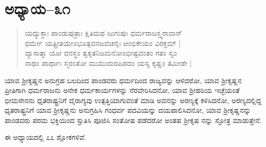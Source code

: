\section{ಅಧ್ಯಾಯ–೩೧}

\begin{verse}
ಯದ್ಯುಕ್ತಾಃ ಪಾಂಡುಪುತ್ರಾಃ ಕ್ಷಿತಿಮಥ ಜುಗುಪುಃ ಧರ್ಮರಾಜಸ್ತ್ವರಾವಾನ್ \\ ಧರ್ಮೇ ಯತ್ಪ್ರೀತಯೇಽಭೂತ್ಪವನಜವಚನೈಃ ಆಂಭಿಕೇಯಂ ವಿರಕ್ತಮ್ |\\ ವ್ಯಾಸಾತ್ಮಾ ಯೋ ವನಸ್ಥಂ ತ್ವಕೃತನಿಜಮನೋಽಭೀಷ್ಟವಂತಂ ಗತಂ ಸ್ವಂ\\ ನಾಥಂ ಪಾರ್ಥಾಃ ಸ್ಮರಂತೋ ಮುಮುದುರಪಿಪದಂ ಯಸ್ಯ ಕೃಷ್ಣಂ ತಮೀಡೇ |
\end{verse}

ಯಾವ ಶ‍್ರೀಕೃಷ್ಣನ ಅನುಗ್ರಹ ಬಲದಿಂದ ಪಾಂಡವರು ಧರ್ಮದಿಂದ ರಾಜ್ಯವನ್ನು ಆಳಿದರೋ, ಯಾವ ಶ‍್ರೀಕೃಷ್ಣನ ಪ್ರೀತಿಗಾಗಿ ಧರ್ಮರಾಜನು ಅನೇಕ ಧರ್ಮಕಾರ್ಯಗಳನ್ನು ನೆರವೇರಿಸಿದನೋ, ಯಾವ ಶ‍್ರೀಹರಿಯ ಇಚ್ಛೆಯಂತೆ ಭೀಮಸೇನನು ಧೃತರಾಷ್ಟ್ರನಿಗೆ ವೈರಾಗ್ಯವು ಉತ್ಪತ್ತಿಯಾಗುವಂತೆ ಮಾಡಿ ಅವನನ್ನು ಅರಣ್ಯಕ್ಕೆ ಕಳಿಸಿದನೋ, ಅರಣ್ಯದಲ್ಲಿದ್ದ ಧೃತರಾಷ್ಟ್ರನಿಗೆ ಯಾವ ಶ‍್ರೀಕೃಷ್ಣನು ಅನುಗ್ರಹಿಸಿ ಗಂಧರ್ವ ಪದವಿಯನ್ನು ದಯಪಾಲಿಸಿದನೋ, ಯಾವ ಶ‍್ರೀಕೃಷ್ಣನನ್ನು ಪಾಂಡವರು ಪರಮ ಭಕ್ತಿಯಿಂದ ಸ್ತುತಿಸಿ ಪೂಜಿಸಿ ಸಂತೋಷ ಪಡೆದರೋ ಅಂತಹ ಶ‍್ರೀಕೃಷ ನನ್ನು ಸ್ತೋತ್ರ ಮಾಡುತ್ತೇನೆ.

ಈ ಅಧ್ಯಾಯದಲ್ಲಿ ೭೭ ಶ್ಲೋಕಗಳಿವೆ.

